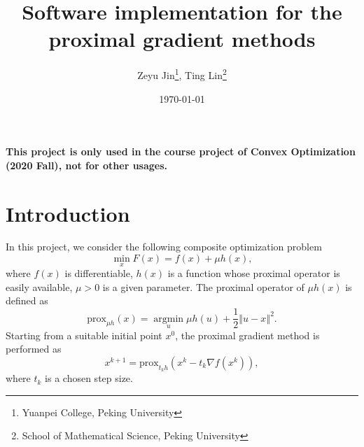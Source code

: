 \documentclass[a4paper]{article}
\title{Software implementation for the proximal gradient methods}
\author{Zeyu Jin\thanks{Yuanpei College, Peking University}, Ting 
Lin\thanks{School of Mathematical Science, Peking University}}
\date{\today}
\newcommand{\norm}[1]{\left\Vert#1\right\Vert}
\newcommand{\prox}{\mathrm{prox}}
\begin{document}
  \maketitle  
  \textbf{\color{red} This project is only used in the course project 
  of Convex Optimization (2020 Fall), not for other usages.}
  \tableofcontents
  
  
  \section{Introduction}
  \label{sec:intro}
  In this project, we consider the following composite optimization 
  problem
  \begin{equation}
    \min\limits_{x} F(x) = f(x) + \mu h(x),
  \end{equation}
  where $f(x)$ is differentiable, $h(x)$ is a function whose 
  proximal operator is easily available, $\mu > 0$ is a given 
  parameter.
  The proximal operator of $\mu h(x)$ is defined as
  \begin{displaymath}
    \prox_{\mu h}(x) = \mathop{\arg\min}\limits_{u} \mu h(u) + 
    \frac{1}{2} \norm{u - x}^2.
  \end{displaymath}
  Starting from a suitable initial point $x^0$, the proximal gradient 
  method is performed as
  \begin{equation}\label{equ:pg}
    x^{k+1} = \prox_{t_k h} (x^k - t_k \nabla f(x^k)),
  \end{equation}
  where $t_k$ is a chosen step size.
  
\end{document}
